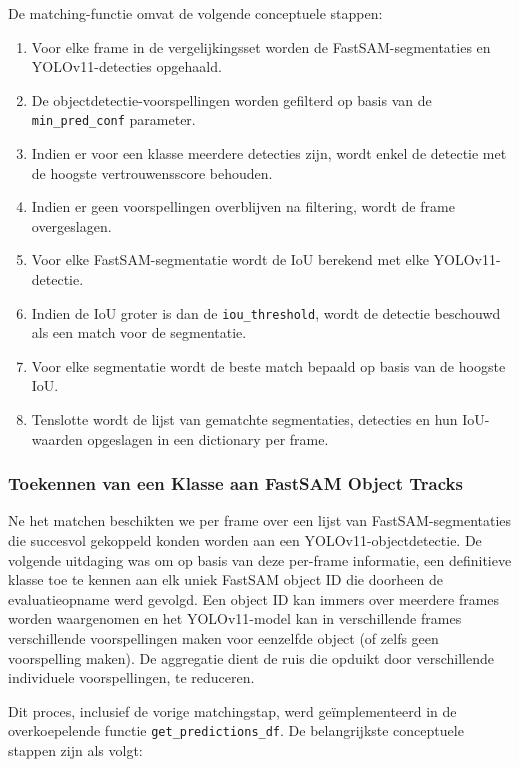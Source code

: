 De matching-functie omvat de volgende conceptuele stappen:
\begin{enumerate}
    \item Voor elke frame in de vergelijkingsset worden de FastSAM-segmentaties en YOLOv11-detecties opgehaald.
    \item De objectdetectie-voorspellingen worden gefilterd op basis van de\\ \texttt{min\_pred\_conf} parameter.
    \item Indien er voor een klasse meerdere detecties zijn, wordt enkel de detectie met de hoogste vertrouwensscore behouden.
    \item Indien er geen voorspellingen overblijven na filtering, wordt de frame overgeslagen.
    \item Voor elke FastSAM-segmentatie wordt de IoU berekend met elke YOLOv11-detectie.
    \item Indien de IoU groter is dan de \texttt{iou\_threshold}, wordt de detectie beschouwd als een match voor de segmentatie.
    \item Voor elke segmentatie wordt de beste match bepaald op basis van de hoogste IoU.
    \item Tenslotte wordt de lijst van gematchte segmentaties, detecties en hun IoU-waarden opgeslagen in een dictionary per frame.
\end{enumerate}

\subsubsection{Toekennen van een Klasse aan FastSAM Object Tracks}

Ne het matchen beschikten we per frame over een lijst van FastSAM-segmentaties die 
succesvol gekoppeld konden worden aan een YOLOv11-objectdetectie.
De volgende uitdaging was om op basis van deze per-frame informatie, een definitieve klasse toe te kennen aan elk uniek FastSAM object ID
die doorheen de evaluatieopname werd gevolgd.
Een object ID kan immers over meerdere frames worden waargenomen 
en het YOLOv11-model kan in verschillende frames verschillende voorspellingen maken voor eenzelfde object (of zelfs geen voorspelling maken).
De aggregatie dient de ruis die opduikt door verschillende individuele voorspellingen, te reduceren.

Dit proces, inclusief de vorige matchingstap, werd geïmplementeerd in de overkoepelende functie \texttt{get\_predictions\_df}.
De belangrijkste conceptuele stappen zijn als volgt:

